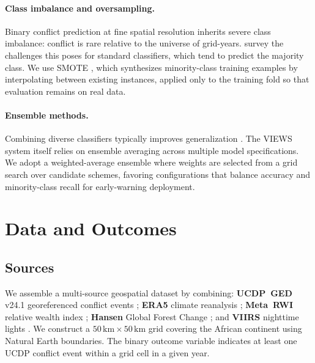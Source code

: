 \documentclass[11pt,a4paper]{article}
\begin{document}
\paragraph{Class imbalance and oversampling.}
Binary conflict prediction at fine spatial resolution inherits severe class imbalance: conflict is rare relative to the universe of grid-years. \textcite{he2009imbalanced} survey the challenges this poses for standard classifiers, which tend to predict the majority class. We use SMOTE \parencite{chawla2002smote}, which synthesizes minority-class training examples by interpolating between existing instances, applied only to the training fold so that evaluation remains on real data.

\paragraph{Ensemble methods.}
Combining diverse classifiers typically improves generalization \parencite{dietterich2000ensemble}. The VIEWS system \parencite{hegre2024views} itself relies on ensemble averaging across multiple model specifications. We adopt a weighted-average ensemble where weights are selected from a grid search over candidate schemes, favoring configurations that balance accuracy and minority-class recall for early-warning deployment.

\section{Data and Outcomes}

\subsection{Sources}
We assemble a multi-source geospatial dataset by combining: \textbf{UCDP~GED} v24.1 georeferenced conflict events \parencite{sundberg2013introducing}; \textbf{ERA5} climate reanalysis \parencite{hersbach2020era5}; \textbf{Meta~RWI} relative wealth index \parencite{chi2022microestimates}; \textbf{Hansen} Global Forest Change \parencite{hansen2013high}; and \textbf{VIIRS} nighttime lights \parencite{elvidge2017viirs}. We construct a $50\,\mathrm{km}\times50\,\mathrm{km}$ grid covering the African continent using Natural Earth boundaries. The binary outcome variable indicates at least one UCDP conflict event within a grid cell in a given year.
\end{document}
